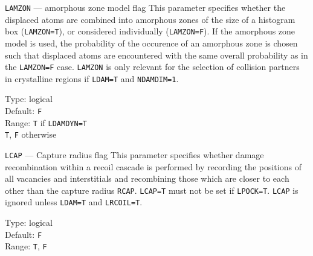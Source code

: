 \begin{keydescription}{\texttt{LAMZON} --- amorphous zone model flag}
%
  This parameter specifies whether the displaced atoms are combined into
  amorphous zones of the size of a histogram box (\texttt{LAMZON=T}), or
  considered individually (\texttt{LAMZON=F}). If the amorphous zone
  model is used, the probability of the occurence of an amorphous zone
  is chosen such that displaced atoms are encountered with the same
  overall probability as in the \texttt{LAMZON=F} case. \texttt{LAMZON}
  is only relevant for the selection of collision partners in 
  crystalline regions if \texttt{LDAM=T} and \texttt{NDAMDIM=1}.
  \begin{keytab}
    Type:    \> logical \\
    Default: \> \texttt{F} \\
    Range:   \> \texttt{T} if \texttt{LDAMDYN=T} \\
                \texttt{T}, \texttt{F} otherwise
  \end{keytab}
\end{keydescription}

\begin{keydescription}{\texttt{LCAP} --- Capture radius flag}
%
  This parameter specifies whether damage recombination within a recoil
  cascade is performed by recording the positions of all vacancies and
  interstitials and recombining those which are closer to each other
  than the capture radius \texttt{RCAP}. \texttt{LCAP=T} must not be set if
  \texttt{LPOCK=T}. \texttt{LCAP} is ignored unless \texttt{LDAM=T} and 
  \texttt{LRCOIL=T}.
  \begin{keytab}
    Type:    \> logical \\
    Default: \> \texttt{F} \\
    Range:   \> \texttt{T}, \texttt{F}
  \end{keytab}
\end{keydescription}

